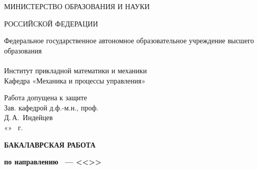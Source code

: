 \thispagestyle{empty}%
\begin{center}%
\MakeUppercase{Министерство образования и науки}

\MakeUppercase{Российской Федерации}

{
Федеральное государственное автономное образовательное учреждение высшего образования \\
\thesisOrganization \\
Институт прикладной математики и механики \\
Кафедра «Механика и процессы управления»}

\end{center}%
%
\vspace{0pt plus2fill} %


\newlength{\ML}
\hfill\begin{minipage}{0.4\textwidth}
  Работа допущена к защите\\
  Зав. кафедрой д.ф.-м.н., проф. \\
  \underline{\hspace{\ML}} Д.\,А.~Индейцев\\
  «\underline{\hspace{1.0cm}}» \underline{\hspace{\ML}} \thesisYear\ г.
\end{minipage}%
\bigskip

%
\vspace{0pt plus1fill} %
\begin{center}%
{
\textbf{\MakeUppercase{Бакалаврская работа}}

\textbf{по направлению \thesisSpecialtyNumber~--- <<\thesisSpecialtyTitle>>}

}
\end{center}%
%
\begin{center}%
\textbf {\large \thesisTitle}

\vspace{0pt plus2fill} %

\end{center}%
%
\vspace{0pt plus2fill} %

